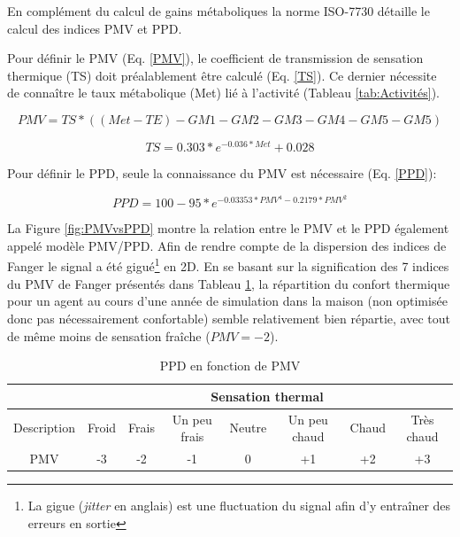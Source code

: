 En complément du calcul de gains métaboliques la norme ISO-7730 détaille le calcul des indices PMV et PPD. 

Pour définir le PMV (Eq. \ref{PMV}), le coefficient de transmission de sensation thermique (TS) doit préalablement être calculé (Eq. \ref{TS}). Ce dernier nécessite de connaître le taux métabolique (Met) lié à l'activité (Tableau \ref{tab:Activités}).

\begin{equation}
PMV=TS*((Met-TE)-GM1-GM2-GM3-GM4-GM5-GM5)
\label{PMV}
\end{equation}

\begin{equation}
TS=0.303*e^{-0.036*Met}+0.028
\label{TS}
\end{equation}

Pour définir le PPD, seule la connaissance du PMV est nécessaire (Eq. \ref{PPD}):

\begin{equation}
PPD=100-95*e^{-0.03353*PMV^{4}-0.2179*PMV^{2}}
\label{PPD}
\end{equation}

La Figure \ref{fig:PMVvsPPD} montre la relation entre le PMV et le PPD également appelé modèle PMV/PPD. Afin de rendre compte de la dispersion des indices de Fanger le signal a été gigué\footnote{La gigue (\textit{jitter} en anglais) est une fluctuation du signal afin d'y entraîner des erreurs en sortie} en 2D. En se basant sur la signification des 7 indices du PMV de Fanger présentés dans Tableau \ref{tab:PMVPPD}, la répartition du confort thermique pour un agent au cours d'une année de simulation dans la maison (non optimisée donc pas nécessairement confortable) semble relativement bien répartie, avec tout de même moins de sensation fraîche ($PMV = -2$). 

\begin{table}[H]
\begin{tabular}{|c||c|c|c|c|c|c|c|}
\hline 
 & \multicolumn{7}{c|}{Sensation thermal} \\ 
\hline
\hline
Description & Froid & Frais & Un peu frais & Neutre & Un peu chaud & Chaud & Très chaud \\ 
\hline 
PMV & -3 & -2 & -1 & 0 & +1 & +2 & +3 \\ 
\hline
\end{tabular}
\caption{PPD en fonction de PMV}
\label{tab:PMVPPD} 
\end{table}

